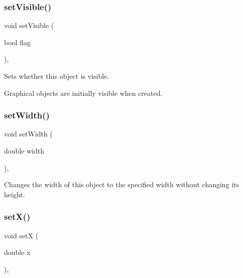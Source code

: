 \subsubsection{\texorpdfstring{set\+Visible()}{setVisible()}}
{\footnotesize\ttfamily void set\+Visible (\begin{DoxyParamCaption}\item[{bool}]{flag }\end{DoxyParamCaption})\hspace{0.3cm}{\ttfamily [virtual]}, {\ttfamily [inherited]}}



Sets whether this object is visible. 

Graphical objects are initially visible when created. \mbox{\label{classsgl_1_1GObject_aa3f3fba4cb131baa8696ba01e3bceca1}} 
\subsubsection{\texorpdfstring{set\+Width()}{setWidth()}}
{\footnotesize\ttfamily void set\+Width (\begin{DoxyParamCaption}\item[{double}]{width }\end{DoxyParamCaption})\hspace{0.3cm}{\ttfamily [virtual]}, {\ttfamily [inherited]}}



Changes the width of this object to the specified width without changing its height. 

\mbox{\label{classsgl_1_1GObject_a9c18fcc579333bf9653d13ad2b372e39}} 
\subsubsection{\texorpdfstring{set\+X()}{setX()}}
{\footnotesize\ttfamily void setX (\begin{DoxyParamCaption}\item[{double}]{x }\end{DoxyParamCaption})\hspace{0.3cm}{\ttfamily [virtual]}, {\ttfamily [inherited]}}



